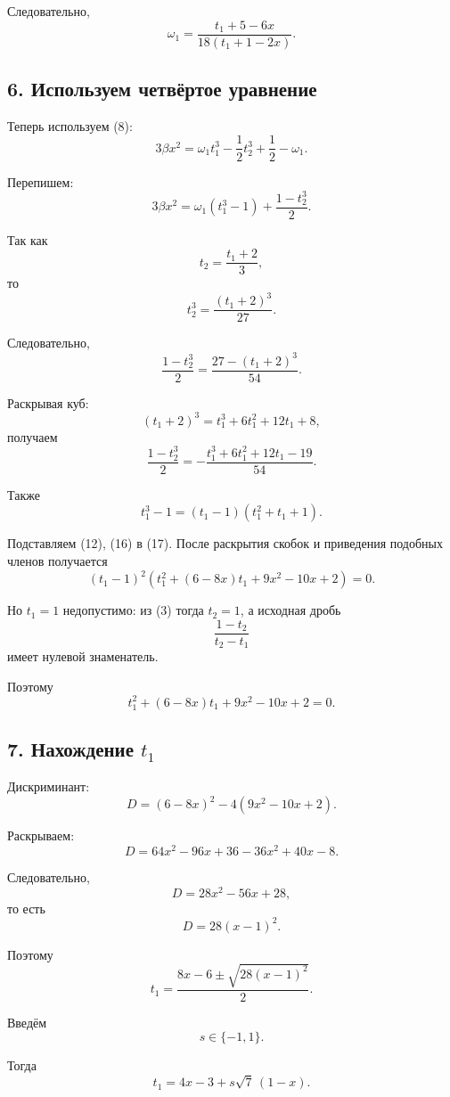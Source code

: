 \documentclass[12pt,a4paper]{article}
\begin{document}
		Следовательно,
		\[
		\boxed{
			\omega_1=
			\frac{t_1+5-6x}
			{18(t_1+1-2x)}
		}.
		\tag{16}
		\]
		
		\subsection*{6. Используем четвёртое уравнение}
		
		Теперь используем (8):
		\[
		3\beta x^2
		=
		\omega_1t_1^3
		-\frac12t_2^3
		+\frac12-\omega_1.
		\]
		
		Перепишем:
		\[
		3\beta x^2
		=
		\omega_1(t_1^3-1)
		+\frac{1-t_2^3}{2}.
		\tag{17}
		\]
		
		Так как
		\[
		t_2=\frac{t_1+2}{3},
		\]
		то
		\[
		t_2^3
		=
		\frac{(t_1+2)^3}{27}.
		\]
		
		Следовательно,
		\[
		\frac{1-t_2^3}{2}
		=
		\frac{27-(t_1+2)^3}{54}.
		\]
		
		Раскрывая куб:
		\[
		(t_1+2)^3
		=
		t_1^3+6t_1^2+12t_1+8,
		\]
		получаем
		\[
		\frac{1-t_2^3}{2}
		=
		-\frac{
			t_1^3+6t_1^2+12t_1-19
		}{54}.
		\]
		
		Также
		\[
		t_1^3-1
		=
		(t_1-1)(t_1^2+t_1+1).
		\]
		
		Подставляем (12), (16) в (17). После раскрытия скобок и
		приведения подобных членов получается
		\[
		\boxed{
			(t_1-1)^2
			\left(
			t_1^2+(6-8x)t_1+9x^2-10x+2
			\right)
			=0.
		}
		\tag{18}
		\]
		
		Но $t_1=1$ недопустимо: из (3) тогда
		$t_2=1$, а исходная дробь
		\[
		\frac{1-t_2}{t_2-t_1}
		\]
		имеет нулевой знаменатель.
		
		Поэтому
		\[
		\boxed{
			t_1^2+(6-8x)t_1+9x^2-10x+2=0.
		}
		\tag{19}
		\]
		
		\subsection*{7. Нахождение $t_1$}
		
		Дискриминант:
		\[
		D
		=
		(6-8x)^2
		-
		4(9x^2-10x+2).
		\]
		
		Раскрываем:
		\[
		D
		=
		64x^2-96x+36
		-36x^2+40x-8.
		\]
		
		Следовательно,
		\[
		D=28x^2-56x+28,
		\]
		то есть
		\[
		\boxed{
			D=28(x-1)^2
		}.
		\tag{20}
		\]
		
		Поэтому
		\[
		t_1
		=
		\frac{8x-6\pm\sqrt{28(x-1)^2}}{2}.
		\]
		
		Введём
		\[
		s\in\{-1,1\}.
		\]
		
		Тогда
		\[
		\boxed{
			t_1
			=
			4x-3+s\sqrt{7}\,(1-x)
		}.
		\tag{21}
		\]
		
\end{document}

